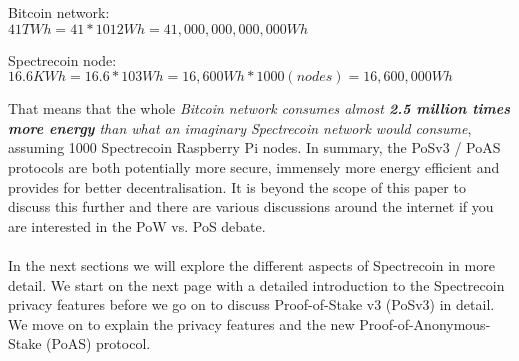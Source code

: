 \vspace{5mm} %

Bitcoin network:\\
$41 TWh = 41*1012 Wh = 41,000,000,000,000 Wh$

\vspace{5mm} %

Spectrecoin node:\\
$16.6 KWh = 16.6 * 103 Wh = 16,600 Wh * 1000 (nodes) = 16,600,000 Wh$

\vspace{5mm} %

That means that the whole \textit{Bitcoin network consumes almost \textbf{2.5 million times
more energy} than what an imaginary Spectrecoin network would consume}, assuming
1000 Spectrecoin Raspberry Pi nodes.
\newpage
\noindent
In summary, the PoSv3 / PoAS protocols are both potentially more secure,
immensely more energy efficient and provides for better decentralisation.
It is beyond the scope of this paper to discuss this further and there are
various discussions around the internet if you are interested in the PoW vs.
PoS debate.
\\
\\
\noindent
In the next sections we will explore the different aspects of Spectrecoin in
more detail. We start on the next page with a detailed introduction to the
Spectrecoin privacy features before we go on to discuss Proof-of-Stake v3
(PoSv3) in detail. We move on to explain the privacy features and the new
Proof-of-Anonymous-Stake (PoAS) protocol.